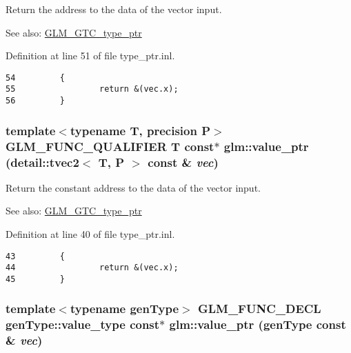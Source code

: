 Return the address to the data of the vector input. \begin{Desc}
\item[See also:]\hyperlink{group__gtc__type__ptr}{GLM\_\-GTC\_\-type\_\-ptr} \end{Desc}


Definition at line 51 of file type\_\-ptr.inl.

\begin{Code}\begin{verbatim}54         {
55                 return &(vec.x);
56         }
\end{verbatim}
\end{Code}


\hypertarget{group__gtc__type__ptr_gb43f07f8b8793c17c58c7b5826d4d5ff}{
\subsubsection[value\_\-ptr]{\setlength{\rightskip}{0pt plus 5cm}template$<$typename T, precision P$>$ GLM\_\-FUNC\_\-QUALIFIER T const$\ast$ glm::value\_\-ptr (detail::tvec2$<$ T, P $>$ const \& {\em vec})}}
\label{group__gtc__type__ptr_gb43f07f8b8793c17c58c7b5826d4d5ff}


Return the constant address to the data of the vector input. \begin{Desc}
\item[See also:]\hyperlink{group__gtc__type__ptr}{GLM\_\-GTC\_\-type\_\-ptr} \end{Desc}


Definition at line 40 of file type\_\-ptr.inl.

\begin{Code}\begin{verbatim}43         {
44                 return &(vec.x);
45         }
\end{verbatim}
\end{Code}


\hypertarget{group__gtc__type__ptr_g87d5cb613f75f83973609ccb8922200b}{
\subsubsection[value\_\-ptr]{\setlength{\rightskip}{0pt plus 5cm}template$<$typename genType$>$ GLM\_\-FUNC\_\-DECL genType::value\_\-type const$\ast$ glm::value\_\-ptr (genType const \& {\em vec})}}
\label{group__gtc__type__ptr_g87d5cb613f75f83973609ccb8922200b}


